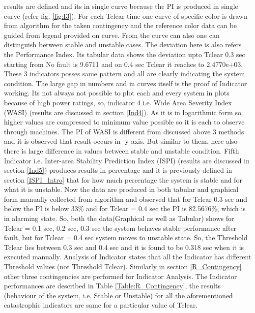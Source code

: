 results are defined and its in single curve because the PI is produced in single curve (refer fig. \ref{fig:I3}). For each Tclear time one curve of specific color is drawn from algorithm for the taken contingency and the reference color data can be guided from legend provided on curve. From the curve can also one can distinguish between stable and unstable cases. The deviation here is also refers the Performance Index. Its tabular data shows the deviation upto Tclear 0.3 sec starting from No fault is 9.6711 and on 0.4 sec Tclear it reaches to 2.4770e+03. These 3 indicators posses same pattern and all are clearly indicating the system condition. The large gap in numbers and in curves itself is the proof of Indicator working. Its not always not possible to plot each and every system in plots because of high power ratings, so, indicator 4 i.e. Wide Area Severity Index (WASI) (results are discussed in section \ref{Ind4}). As it is in logarithmic form so higher values are compressed to minimum value possible so it is each to observe through machines. The PI of WASI is different from discussed above 3 methods and it is observed that result occurs in -y axis. But similar to them, here also there is large difference in values between stable and unstable condition. Fifth Indicator i.e. Inter-area Stability Prediction Index (ISPI) (results are discussed in section \ref{Ind5}) produces results in percentage and it is previously defined in section \ref{ISPI_Intro} that for how much percentage the system is stable and for what it is unstable. Now the data are produced in both tabular and graphical form manually collected from algorithm and observed that for Tclear 0.3 sec and below the PI is below 33\% and for Tclear = 0.4 sec the PI is 82.5676\%, which is in alarming state. So, both the data(Graphical as well as Tabular) shows for Tclear = 0.1 sec, 0.2 sec, 0.3 sec the system behaves stable performance after fault, but for Tclear = 0.4 sec system moves to unstable state. So, the Threshold Tclear lies between 0.3 sec and 0.4 sec and it is found to be 0.318 sec when it is executed manually. Analysis of Indicator states that all the Indicator has different Threshold values (not Threshold Tclear). Similarly in section \ref{R_Contingency} other three contingencies are performed for Indicator Analysis. The Indicator performances are described in Table \ref{Table:R_Contingency}, the results (behaviour of the system, i.e. Stable or Unstable) for all the aforementioned catastrophic indicators are same for a particular value of Tclear.
